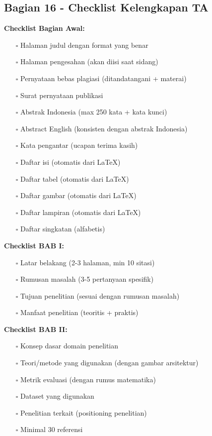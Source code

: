 \subsection*{Bagian 16 - Checklist Kelengkapan TA}

\textbf{Checklist Bagian Awal:}
\begin{enumerate}
    \item[$\square$] Halaman judul dengan format yang benar
    \item[$\square$] Halaman pengesahan (akan diisi saat sidang)
    \item[$\square$] Pernyataan bebas plagiasi (ditandatangani + materai)
    \item[$\square$] Surat pernyataan publikasi
    \item[$\square$] Abstrak Indonesia (max 250 kata + kata kunci)
    \item[$\square$] Abstract English (konsisten dengan abstrak Indonesia)
    \item[$\square$] Kata pengantar (ucapan terima kasih)
    \item[$\square$] Daftar isi (otomatis dari LaTeX)
    \item[$\square$] Daftar tabel (otomatis dari LaTeX)
    \item[$\square$] Daftar gambar (otomatis dari LaTeX)
    \item[$\square$] Daftar lampiran (otomatis dari LaTeX)
    \item[$\square$] Daftar singkatan (alfabetis)
\end{enumerate}

\textbf{Checklist BAB I:}
\begin{enumerate}
    \item[$\square$] Latar belakang (2-3 halaman, min 10 sitasi)
    \item[$\square$] Rumusan masalah (3-5 pertanyaan spesifik)
    \item[$\square$] Tujuan penelitian (sesuai dengan rumusan masalah)
    \item[$\square$] Manfaat penelitian (teoritis + praktis)
\end{enumerate}

\textbf{Checklist BAB II:}
\begin{enumerate}
    \item[$\square$] Konsep dasar domain penelitian
    \item[$\square$] Teori/metode yang digunakan (dengan gambar arsitektur)
    \item[$\square$] Metrik evaluasi (dengan rumus matematika)
    \item[$\square$] Dataset yang digunakan
    \item[$\square$] Penelitian terkait (positioning penelitian)
    \item[$\square$] Minimal 30 referensi
\end{enumerate}

